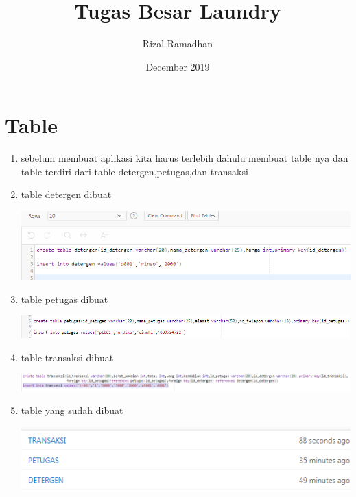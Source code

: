 \documentclass{article}
\title{Tugas Besar Laundry}
\author{Rizal Ramadhan }
\date{December 2019}
\begin{document}
\maketitle

\section{Table}

\begin{enumerate}
\item sebelum membuat aplikasi kita harus terlebih dahulu membuat table nya dan table terdiri dari table detergen,petugas,dan transaksi
    
\item table detergen dibuat
    \begin{center}
         \centering
            \includegraphics[scale=0.27]{gambar/Capture1.PNG}
        \caption{}
        \label{excel}
    \end{center}

\item table petugas dibuat
    \begin{center}
         \centering
            \includegraphics[scale=0.27]{gambar/Capture2.PNG}
        \caption{}
        \label{excel}
    \end{center}
    
\item table transaksi dibuat
    \begin{center}
         \centering
            \includegraphics[scale=0.27]{gambar/Capture3.PNG}
        \caption{}
        \label{excel}
    \end{center}
    
\item table yang sudah dibuat 
    \begin{center}
         \centering
            \includegraphics[scale=0.27]{gambar/Capture4.PNG}
        \caption{}
        \label{excel}
    \end{center}
    

\end{enumerate}
\end{document}
